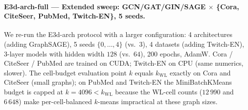 \documentclass[10pt]{article}
\theoremstyle{definition}
\theoremstyle{remark}
\begin{document}
\paragraph{E3d-arch-full --- Extended sweep:
GCN/GAT/GIN/SAGE $\times$ \{Cora, CiteSeer, PubMed, Twitch-EN\},
5 seeds.}
We re-run the E3d-arch protocol with a larger configuration:
4 architectures (adding GraphSAGE), 5 seeds $\{0,\dots,4\}$
(vs.\ 3), 4 datasets (adding Twitch-EN), 3-layer models with
hidden width $128$ (vs.\ $64$), 200 epochs, AdamW.
Cora / CiteSeer / PubMed are trained on CUDA; Twitch-EN on CPU
(same numerics, slower). The cell-budget evaluation point $k$
equals $k_{\mathrm{WL}}$ exactly on Cora and CiteSeer (small
graphs); on PubMed and Twitch-EN the MiniBatchKMeans budget is
capped at $k = 4096 < k_{\mathrm{WL}}$ because the WL-cell
counts ($12\,990$ and $6\,648$) make per-cell-balanced
$k$-means impractical at these graph sizes.
\end{document}
